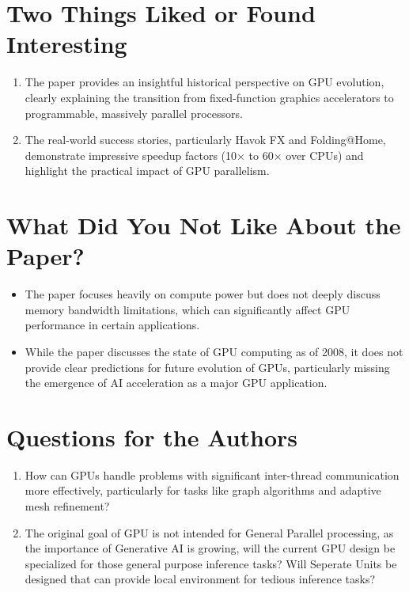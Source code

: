 \documentclass[12pt]{article}
\begin{document}
\section{Two Things Liked or Found Interesting}
\begin{enumerate}[noitemsep]
    \item The paper provides an insightful historical perspective on GPU evolution, clearly explaining the transition from fixed-function graphics accelerators to programmable, massively parallel processors.
    \item The real-world success stories, particularly Havok FX and Folding@Home, demonstrate impressive speedup factors (10× to 60× over CPUs) and highlight the practical impact of GPU parallelism.
\end{enumerate}

\section{What Did You Not Like About the Paper?}
\begin{itemize}[noitemsep]
    \item The paper focuses heavily on compute power but does not deeply discuss memory bandwidth limitations, which can significantly affect GPU performance in certain applications.
    \item While the paper discusses the state of GPU computing as of 2008, it does not provide clear predictions for future evolution of GPUs, particularly missing the emergence of AI acceleration as a major GPU application.
\end{itemize}

\section{Questions for the Authors}
\begin{enumerate}[noitemsep]
    \item How can GPUs handle problems with significant inter-thread communication more effectively, particularly for tasks like graph algorithms and adaptive mesh refinement?
    \item The original goal of GPU is not intended for General Parallel processing, as the importance of Generative AI is growing, will the current GPU design be specialized for those general purpose inference tasks? Will Seperate Units be designed that can provide local environment for tedious inference tasks?
\end{enumerate}
\end{document}
